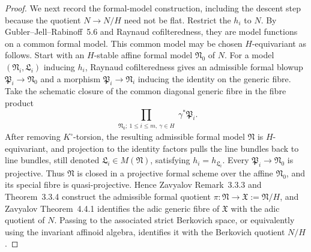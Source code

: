 \begin{proof}
We next record the formal-model construction, including the descent step
because the quotient $N\to N/H$ need not be flat.  Restrict the $h_i$ to
$N$.  By Gubler--Jell--Rabinoff~5.6 and Raynaud cofilteredness, they are model
functions on a common formal model.  This common model may be chosen
$H$-equivariant as follows.  Start with an $H$-stable affine formal model
$\mathfrak N_0$ of $N$.  For a model
$(\mathfrak N_i,\mathfrak L_i)$ inducing $h_i$, Raynaud cofilteredness gives
an admissible formal blowup $\mathfrak P_i\to\mathfrak N_0$ and a morphism
$\mathfrak P_i\to\mathfrak N_i$ inducing the identity on the generic fibre.
Take the schematic closure of the common diagonal generic fibre in the
fibre product
\[
       \prod_{\substack{\mathfrak N_0;\ 1\leq i\leq m,\ \gamma\in H}}
             \gamma^*\mathfrak P_i.
\]
After removing $K^\circ$-torsion, the resulting admissible formal model
$\mathfrak N$ is $H$-equivariant, and projection to the identity factors
pulls the line bundles back to line bundles, still denoted
$\mathfrak L_i\in M(\mathfrak N)$, satisfying
$h_i=h_{\mathfrak L_i}$.  Every $\mathfrak P_i\to\mathfrak N_0$ is
projective.  Thus $\mathfrak N$ is closed in a projective formal scheme over
the affine $\mathfrak N_0$, and its special fibre is quasi-projective.  Hence
Zavyalov Remark~3.3.3 and Theorem~3.3.4 construct the admissible formal
quotient $\pi:\mathfrak N\to\mathfrak X:=\mathfrak N/H$, and Zavyalov
Theorem~4.4.1 identifies the adic generic fibre of $\mathfrak X$ with the
adic quotient of $N$.  Passing to the associated strict Berkovich space, or
equivalently using the invariant affinoid algebra, identifies it with the
Berkovich quotient $N/H$.


\end{proof}
